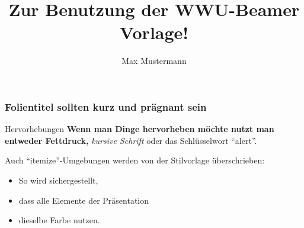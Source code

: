 \documentclass{beamer}
\author{Max Mustermann}
\title{Zur Benutzung der WWU-Beamer Vorlage!}
\begin{document}


\begin{frame}[plain]
  \maketitle
\end{frame}

\begin{frame}
  \frametitle{Folientitel sollten kurz und pr\"agnant sein}
  \begin{block}{Hervorhebungen}
    \textbf{Wenn man Dinge hervorheben m\"ochte nutzt man entweder Fettdruck,}
    \textit{ kursive Schrift} \alert{ oder das Schl\"usselwort ``alert''}.

  Auch ``itemize''-Umgebungen werden von der Stilvorlage überschrieben:
  \end{block}
  \pause
  \begin{itemize}
    \item So wird sichergestellt,
    \item dass alle Elemente der Präsentation 
    \item dieselbe Farbe nutzen.
  \end{itemize}
\end{frame}





\end{document}
